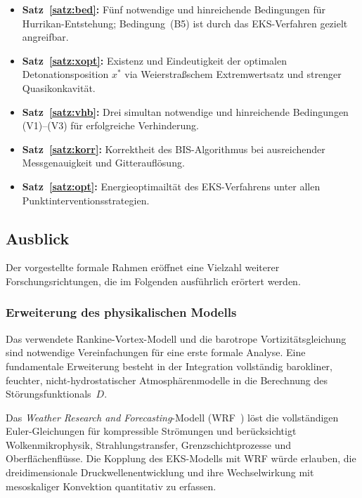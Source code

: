 ﻿\documentclass[a4paper,12pt]{article}
\theoremstyle{definition}
\begin{document}
\begin{itemize}
    \item \textbf{Satz~\ref{satz:bed}:} F\"{u}nf notwendige und hinreichende
          Bedingungen f\"{u}r Hurrikan-Entstehung; Bedingung~(B5) ist durch
          das EKS-Verfahren gezielt angreifbar.
    \item \textbf{Satz~\ref{satz:xopt}:} Existenz und Eindeutigkeit der
          optimalen Detonationsposition $x^{*}$ via Weierstra\ss{}schem
          Extremwertsatz und strenger Quasikonkavit\"{a}t.
    \item \textbf{Satz~\ref{satz:vhb}:} Drei simultan notwendige und
          hinreichende Bedingungen (V1)--(V3) f\"{u}r erfolgreiche Verhinderung.
    \item \textbf{Satz~\ref{satz:korr}:} Korrektheit des BIS-Algorithmus
          bei ausreichender Messgenauigkeit und Gitteraufl\"{o}sung.
    \item \textbf{Satz~\ref{satz:opt}:} Energieoptimailt\"{a}t des EKS-Verfahrens
          unter allen Punktinterventionsstrategien.
\end{itemize}

\subsection{Ausblick}

Der vorgestellte formale Rahmen er\"{o}ffnet eine Vielzahl weiterer
Forschungsrichtungen, die im Folgenden ausf\"{u}hrlich er\"{o}rtert werden.

\subsubsection{Erweiterung des physikalischen Modells}

Das verwendete Rankine-Vortex-Modell und die barotrope Vortizit\"{a}tsgleichung
sind notwendige Vereinfachungen f\"{u}r eine erste formale Analyse.
Eine fundamentale Erweiterung besteht in der Integration vollst\"{a}ndig
barokliner, feuchter, nicht-hydrostatischer Atmosph\"{a}renmodelle in die
Berechnung des St\"{o}rungsfunktionals~$D$.

Das \emph{Weather Research and Forecasting}-Modell
(WRF~\cite{skamarock2008}) l\"{o}st die vollst\"{a}ndigen Euler-Gleichungen
f\"{u}r kompressible Str\"{o}mungen und ber\"{u}cksichtigt Wolkenmikrophysik,
Strahlungstransfer, Grenzschichtprozesse und Oberfl\"{a}chenfl\"{u}sse.
Die Kopplung des EKS-Modells mit WRF w\"{u}rde erlauben, die
dreidimensionale Druckwellenentwicklung und ihre Wechselwirkung mit
mesoskaliger Konvektion quantitativ zu erfassen.
\end{document}
